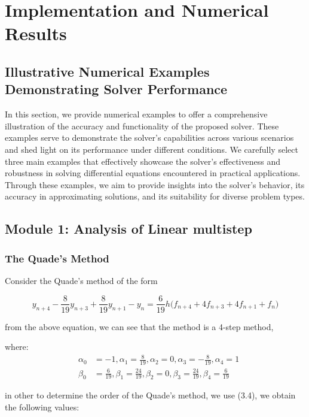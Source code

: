 \chapter{Implementation and Numerical Results}
\section*{Illustrative Numerical Examples Demonstrating Solver Performance}

In this section, we provide numerical examples to offer a comprehensive illustration of the accuracy and functionality of the proposed solver. These examples serve to demonstrate the solver's capabilities across various scenarios and shed light on its performance under different conditions. We carefully select three main examples that effectively showcase the solver's effectiveness and robustness in solving differential equations encountered in practical applications. Through these examples, we aim to provide insights into the solver's behavior, its accuracy in approximating solutions, and its suitability for diverse problem types.



\section{Module 1: Analysis of Linear multistep}
\subsection{The Quade's Method}
Consider the Quade's method of the form \cite{lambert1977}

\begin{equation}
    y_{n+4} - \frac{8}{19}y_{n+3} + \frac{8}{19}y_{n+1} - y_{n} =  \frac{6}{19}h\bigl(f_{n+4}+4f_{n+3}+4f_{n+1}+f_{n}\bigr)
\end{equation}


from the above equation, we can see that the method is a 4-step method,


where:
\[
\begin{aligned}&\alpha_0 &= -1, \alpha_1 = \frac{8}{19}, \alpha_2 = 0, \alpha_3 = -\frac{8}{19}, \alpha_4 = 1 \\
&\beta_0 &= \frac{6}{19}, \beta_1 = \frac{24}{19}, \beta_2 = 0, \beta_3 = \frac{24}{19}, \beta_4 = \frac{6}{19} 
\end{aligned}
\]

in other to determine the order of the Quade's method, we use (3.4), we obtain the following values:


